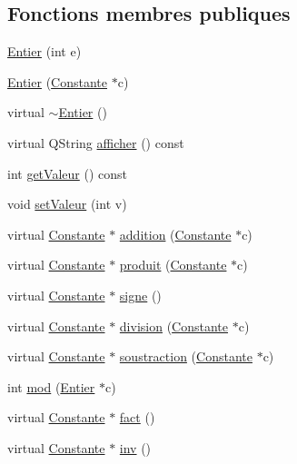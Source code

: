 \subsection*{\-Fonctions membres publiques}
\begin{DoxyCompactItemize}
\item 
\hyperlink{class_entier_a35115c0f47f2d94e1697e20624a1c4d1}{\-Entier} (int e)
\item 
\hyperlink{class_entier_a94158ae6fbad4c9a74815716f5f0f629}{\-Entier} (\hyperlink{class_constante}{\-Constante} $\ast$c)
\item 
virtual \hyperlink{class_entier_ab44549f9d4abf2fd4425f8e3374cdc08}{$\sim$\-Entier} ()
\item 
virtual \-Q\-String \hyperlink{class_entier_adc0a7554faa45a68eb7432798b6892cc}{afficher} () const 
\item 
int \hyperlink{class_entier_afe38ee7f81afc3c88a2c774ff0af2bcd}{get\-Valeur} () const 
\item 
void \hyperlink{class_entier_a22e1c5d0ecf304cd6033e6bf453cc0c1}{set\-Valeur} (int v)
\item 
virtual \hyperlink{class_constante}{\-Constante} $\ast$ \hyperlink{class_entier_ab093dd3f0aa7777c4300362f7ba78ff4}{addition} (\hyperlink{class_constante}{\-Constante} $\ast$c)
\item 
virtual \hyperlink{class_constante}{\-Constante} $\ast$ \hyperlink{class_entier_aa83349a1b984adbd53766ebac2614faf}{produit} (\hyperlink{class_constante}{\-Constante} $\ast$c)
\item 
virtual \hyperlink{class_constante}{\-Constante} $\ast$ \hyperlink{class_entier_a36ce54a35fc9ab69bef2cffebee01c69}{signe} ()
\item 
virtual \hyperlink{class_constante}{\-Constante} $\ast$ \hyperlink{class_entier_afc338f1f177942411a3c8e0e19fce6ce}{division} (\hyperlink{class_constante}{\-Constante} $\ast$c)
\item 
virtual \hyperlink{class_constante}{\-Constante} $\ast$ \hyperlink{class_entier_a880936c128f077144cd266199cd27585}{soustraction} (\hyperlink{class_constante}{\-Constante} $\ast$c)
\item 
int \hyperlink{class_entier_a29ebe7b4a2b8e8135736389977339330}{mod} (\hyperlink{class_entier}{\-Entier} $\ast$c)
\item 
virtual \hyperlink{class_constante}{\-Constante} $\ast$ \hyperlink{class_entier_a094c16293e7853eafa646d1613db3034}{fact} ()
\item 
virtual \hyperlink{class_constante}{\-Constante} $\ast$ \hyperlink{class_entier_a5e4a3ab5cc280d0e082300207712d5d8}{inv} ()

\end{DoxyCompactItemize}

